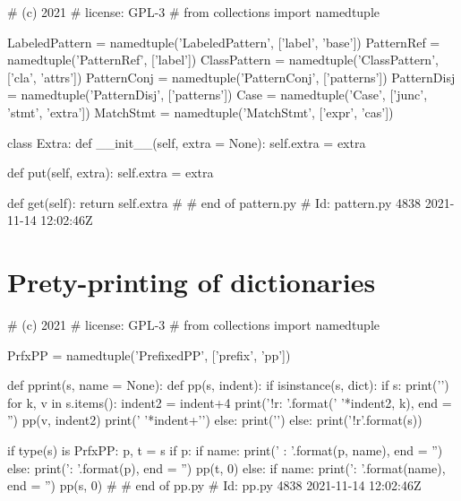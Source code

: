 \begin{dispPy}
#    (c) 2021 
#    license:          GPL-3
#
from collections import namedtuple

LabeledPattern = namedtuple('LabeledPattern', ['label', 'base'])
PatternRef = namedtuple('PatternRef', ['label'])
ClassPattern = namedtuple('ClassPattern', ['cla', 'attrs'])
PatternConj = namedtuple('PatternConj', ['patterns'])
PatternDisj = namedtuple('PatternDisj', ['patterns'])
Case = namedtuple('Case', ['junc', 'stmt', 'extra'])
MatchStmt = namedtuple('MatchStmt', ['expr', 'cas'])

class Extra:
    def __init__(self, extra = None):
        self.extra = extra

    def put(self, extra):
        self.extra = extra

    def get(self):
        return self.extra
#
# end of pattern.py
# Id: pattern.py 4838 2021-11-14 12:02:46Z 
\end{dispPy}

\section{Prety-printing of dictionaries}

\begin{dispPy}
#    (c) 2021 
#    license:          GPL-3
#
from collections import namedtuple

PrfxPP = namedtuple('PrefixedPP', ['prefix', 'pp'])

def pprint(s, name = None):
    def pp(s, indent):
        if isinstance(s, dict):
            if s:
                print('{')
                for k, v in s.items():
                    indent2 = indent+4
                    print('{}{!r}: '.format(' '*indent2, k), end = '')
                    pp(v, indent2)
                print(' '*indent+'}')
            else:
                print('{}')
        else:
            print('{!r}'.format(s))

    if type(s) is PrfxPP:
        p, t = s
        if p:
            if name:
                print('{} {}: '.format(p, name), end = '')
            else:
                print('{}: '.format(p), end = '')
        pp(t, 0)
    else:
        if name:
            print('{}: '.format(name), end = '')
        pp(s, 0)
#
# end of pp.py
# Id: pp.py 4838 2021-11-14 12:02:46Z 
\end{dispPy}

